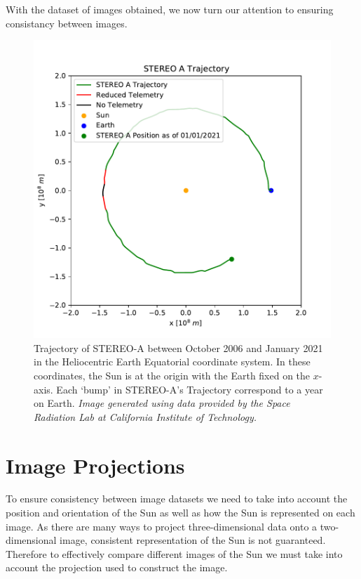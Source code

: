 \documentclass[11pt,a4paper,onecolumn]{report}
\begin{document}
With the dataset of images obtained, we now turn our attention to ensuring
consistancy between images.

\begin{figure}[ht]
  \centering
  \includegraphics[width = 0.7\linewidth]{STEREO_pos.pdf}
  \caption[STEREO-A Trajectory]{Trajectory of STEREO-A between October 2006 and January 2021 in the
  Heliocentric Earth Equatorial coordinate system. In these coordinates, the Sun
  is at the origin with the Earth fixed on the $x$-axis. Each `bump' in STEREO-A's
  Trajectory correspond to a year on Earth. \textit{Image generated using
  data provided by the Space Radiation Lab at California Institute of Technology.}}
  \label{fig:stereo_pos}
\end{figure}


\section{Image Projections}
\label{sec:proj}
To ensure consistency between image datasets we need to take into account the
position and orientation of the Sun as well as how the Sun is represented on
each image. As there are many ways to project three-dimensional data onto a
two-dimensional image, consistent representation of the Sun is not guaranteed.
Therefore to effectively compare different images of the Sun we must take into
account the projection used to construct the image.
\end{document}
